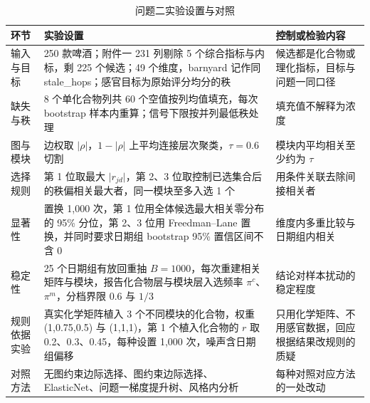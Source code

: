 \begin{table}[H]
\centering\small
\caption{问题二实验设置与对照}
\label{tab:q2-setup}
\begin{tabular}{p{3.0cm}p{5.4cm}p{4.2cm}}
\toprule
环节 & 实验设置 & 控制或检验内容 \\
\midrule
输入与目标 & 250 款啤酒；附件一 231 列剔除 5 个综合指标与内标，剩 225 个候选；49 个维度，barnyard 记作同 stale\_hops；感官目标为原始评分均分的秩 & 候选都是化合物或理化指标，目标与问题一同口径 \\
\addlinespace
缺失与秩 & 8 个单化合物列共 60 个空值按列均值填充，每次 bootstrap 样本内重算；信号下限按并列最低秩处理 & 填充值不解释为浓度 \\
\addlinespace
图与模块 & 边权取 $\lvert\rho\rvert$，$1-\lvert\rho\rvert$ 上平均连接层次聚类，$\tau=0.6$ 切割 & 模块内平均相关至少约为 $\tau$ \\
\addlinespace
选择规则 & 第 1 位取最大 $\lvert r_{jd}\rvert$，第 2、3 位取控制已选集合后的秩偏相关最大者，同一模块至多入选 1 个 & 用条件关联去除间接相关者 \\
\addlinespace
显著性 & 置换 1,000 次，第 1 位用全体候选最大相关零分布的 95\% 分位，第 2、3 位用 Freedman--Lane 置换，并同时要求日期组 bootstrap 95\% 置信区间不含 0 & 维度内多重比较与日期组内相关 \\
\addlinespace
稳定性 & 25 个日期组有放回重抽 $B=1000$，每次重建相关矩阵与模块，报告化合物层与模块层入选频率 $\pi^c$、$\pi^m$，分档界限 0.6 与 $1/3$ & 结论对样本扰动的稳定程度 \\
\addlinespace
规则依据实验 & 真实化学矩阵植入 3 个不同模块的化合物，权重 (1,0.75,0.5) 与 (1,1,1)，第 1 个植入化合物的 $r$ 取 0.2、0.3、0.45，每种设置 1,000 次，噪声含日期组偏移 & 只用化学矩阵、不用感官数据，回应根据结果改规则的质疑 \\
\addlinespace
对照方法 & 无图约束边际选择、图约束边际选择、ElasticNet、问题一梯度提升树、风格内分析 & 每种对照对应方法的一处改动 \\
\bottomrule
\end{tabular}
\end{table}


